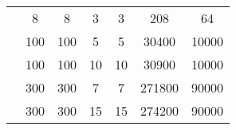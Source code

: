 \begin{table}[H]
\begin{tabular}{ |l||c|c||c|c||c|c|  }
		\cline{2-7}
		                                        & 8                                    & 8                                    & 3                             & 3                         & 208      & 64    \\
		\cline{2-7}
		                                        & 100                                  & 100                                  & 5                             & 5                         & 30400    & 10000 \\
		\cline{2-7}
		                                        & 100                                  & 100                                  & 10                            & 10                        & 30900    & 10000 \\
		\cline{2-7}
		                                        & 300                                  & 300                                  & 7                             & 7                         & 271800   & 90000 \\
		\cline{2-7}
		                                        & 300                                  & 300                                  & 15                            & 15                        & 274200   & 90000 \\
		\hline
	\end{tabular}
\end{table}
